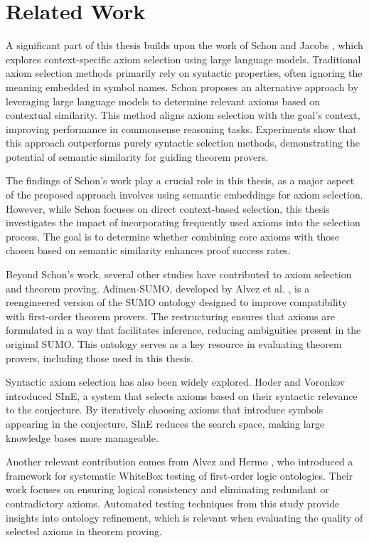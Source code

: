 \documentclass[english,version-2020-11]{uzl-thesis}
\begin{document}
\chapter{Related Work}
\label{chapter-relatedwork}

A significant part of this thesis builds upon the work of Schon and Jacobs \cite{Schon2024}, which explores context-specific axiom selection using large language models. Traditional axiom selection methods primarily rely on syntactic properties, often ignoring the meaning embedded in symbol names. Schon proposes an alternative approach by leveraging large language models to determine relevant axioms based on contextual similarity. This method aligns axiom selection with the goal's context, improving performance in commonsense reasoning tasks. Experiments show that this approach outperforms purely syntactic selection methods, demonstrating the potential of semantic similarity for guiding theorem provers.

The findings of Schon's work play a crucial role in this thesis, as a major aspect of the proposed approach involves using semantic embeddings for axiom selection. However, while Schon focuses on direct context-based selection, this thesis investigates the impact of incorporating frequently used axioms into the selection process. The goal is to determine whether combining core axioms with those chosen based on semantic similarity enhances proof success rates.

Beyond Schon's work, several other studies have contributed to axiom selection and theorem proving. Adimen-SUMO, developed by Alvez et al. \cite{Alvez2014}, is a reengineered version of the SUMO ontology designed to improve compatibility with first-order theorem provers. The restructuring ensures that axioms are formulated in a way that facilitates inference, reducing ambiguities present in the original SUMO. This ontology serves as a key resource in evaluating theorem provers, including those used in this thesis.

Syntactic axiom selection has also been widely explored. Hoder and Voronkov \cite{Hoder2011} introduced SInE, a system that selects axioms based on their syntactic relevance to the conjecture. By iteratively choosing axioms that introduce symbols appearing in the conjecture, SInE reduces the search space, making large knowledge bases more manageable.

Another relevant contribution comes from Alvez and Hermo \cite{Alvez2017}, who introduced a framework for systematic WhiteBox testing of first-order logic ontologies. Their work focuses on ensuring logical consistency and eliminating redundant or contradictory axioms. Automated testing techniques from this study provide insights into ontology refinement, which is relevant when evaluating the quality of selected axioms in theorem proving.
\end{document}
